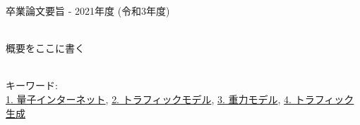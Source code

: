 卒業論文要旨 - 2021年度 (令和3年度)
\begin{center}
\begin{large}
\end{large}
\end{center}

~ \\

概要をここに書く

~ \\
キーワード:\\
\underline{1. 量子インターネット},
\underline{2. トラフィックモデル},
\underline{3. 重力モデル},
\underline{4. トラフィック生成}
\begin{flushright}
\dept \\
\author
\end{flushright}
